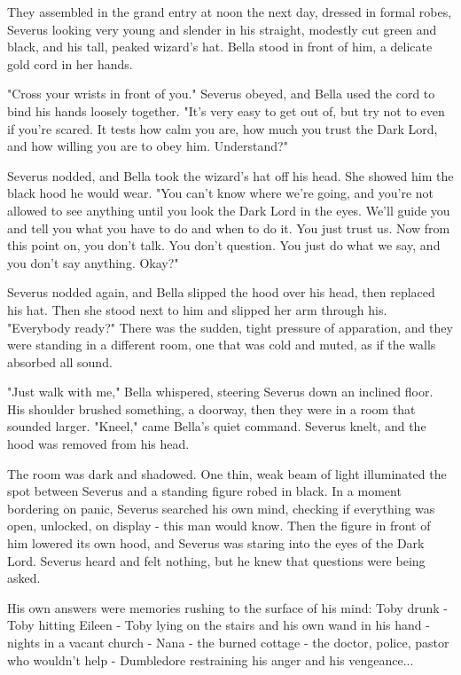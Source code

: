 \documentclass[a4paper,11pt]{article}
\begin{document}
They assembled in the grand entry at noon the next day, dressed in formal robes, Severus looking very young and slender in his straight, modestly cut green and black, and his tall, peaked wizard's hat. Bella stood in front of him, a delicate gold cord in her hands.

"Cross your wrists in front of you." Severus obeyed, and Bella used the cord to bind his hands loosely together. "It's very easy to get out of, but try not to even if you're scared. It tests how calm you are, how much you trust the Dark Lord, and how willing you are to obey him. Understand?"

Severus nodded, and Bella took the wizard's hat off his head. She showed him the black hood he would wear. "You can't know where we're going, and you're not allowed to see anything until you look the Dark Lord in the eyes. We'll guide you and tell you what you have to do and when to do it. You just trust us. Now from this point on, you don't talk. You don't question. You just do what we say, and you don't say anything. Okay?"

Severus nodded again, and Bella slipped the hood over his head, then replaced his hat. Then she stood next to him and slipped her arm through his. "Everybody ready?" There was the sudden, tight pressure of apparation, and they were standing in a different room, one that was cold and muted, as if the walls absorbed all sound.

"Just walk with me," Bella whispered, steering Severus down an inclined floor. His shoulder brushed something, a doorway, then they were in a room that sounded larger. "Kneel," came Bella's quiet command. Severus knelt, and the hood was removed from his head.

The room was dark and shadowed. One thin, weak beam of light illuminated the spot between Severus and a standing figure robed in black. In a moment bordering on panic, Severus searched his own mind, checking if everything was open, unlocked, on display - this man would know. Then the figure in front of him lowered its own hood, and Severus was staring into the eyes of the Dark Lord. Severus heard and felt nothing, but he knew that questions were being asked.

His own answers were memories rushing to the surface of his mind: Toby drunk - Toby hitting Eileen - Toby lying on the stairs and his own wand in his hand - nights in a vacant church - Nana - the burned cottage - the doctor, police, pastor who wouldn't help - Dumbledore restraining his anger and his vengeance...
\end{document}
